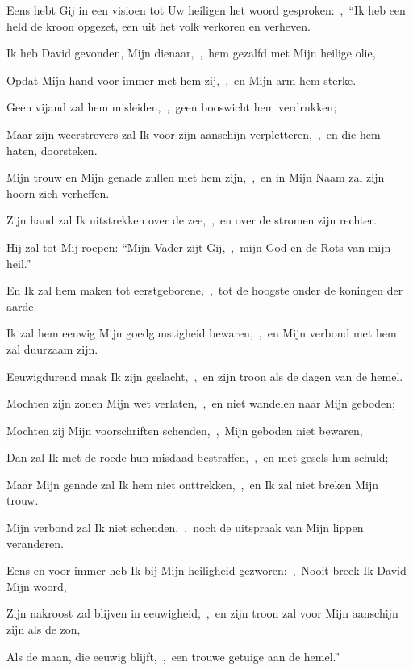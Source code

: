 \documentclass[12pt,twoside,a5paper]{article}
\begin{document}
\begin{halfparskip}

  Eens hebt Gij in een visioen tot Uw heiligen het woord gesproken:~\sep\ ``Ik heb een held de kroon opgezet, een uit het volk verkoren en verheven.

  Ik heb David gevonden, Mijn dienaar,~\sep\ hem gezalfd met Mijn heilige olie,

  Opdat Mijn hand voor immer met hem zij,~\sep\ en Mijn arm hem sterke.

  Geen vijand zal hem misleiden,~\sep\ geen booswicht hem verdrukken;

  Maar zijn weerstrevers zal Ik voor zijn aanschijn verpletteren,~\sep\ en die hem haten, doorsteken.

  Mijn trouw en Mijn genade zullen met hem zijn,~\sep\ en in Mijn Naam zal zijn hoorn zich verheffen.

  Zijn hand zal Ik uitstrekken over de zee,~\sep\ en over de stromen zijn rechter.

  Hij zal tot Mij roepen: ``Mijn Vader zijt Gij,~\sep\ mijn God en de Rots van mijn heil.''

  En Ik zal hem maken tot eerstgeborene,~\sep\ tot de hoogste onder de koningen der aarde.

  Ik zal hem eeuwig Mijn goedgunstigheid bewaren,~\sep\ en Mijn verbond met hem zal duurzaam zijn.

  Eeuwigdurend maak Ik zijn geslacht,~\sep\ en zijn troon als de dagen van de hemel.
\end{halfparskip}

\begin{halfparskip}

  Mochten zijn zonen Mijn wet verlaten,~\sep\ en niet wandelen naar Mijn geboden;

  Mochten zij Mijn voorschriften schenden,~\sep\ Mijn geboden niet bewaren,

  Dan zal Ik met de roede hun misdaad bestraffen,~\sep\ en met gesels hun schuld;

  Maar Mijn genade zal Ik hem niet onttrekken,~\sep\ en Ik zal niet breken Mijn trouw.

  Mijn verbond zal Ik niet schenden,~\sep\ noch de uitspraak van Mijn lippen veranderen.

  Eens en voor immer heb Ik bij Mijn heiligheid gezworen:~\sep\ Nooit breek Ik David Mijn woord,

  Zijn nakroost zal blijven in eeuwigheid,~\sep\ en zijn troon zal voor Mijn aanschijn zijn als de zon,

  Als de maan, die eeuwig blijft,~\sep\ een trouwe getuige aan de hemel.''
\end{halfparskip}
\end{document}
